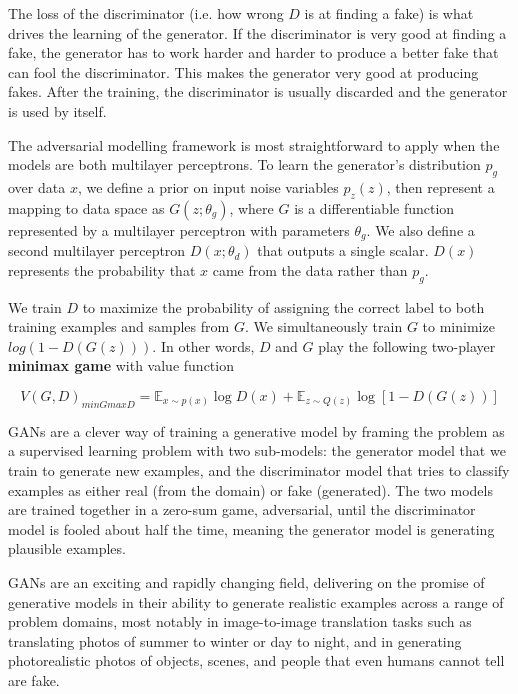 \documentclass[a4paper]{article}
\begin{document}
    The loss of the discriminator (i.e. how wrong $D$ is at finding a fake) is what drives the 
    learning of the generator. If the discriminator is very good at finding a fake, the generator 
    has to work harder and harder to produce a better fake that can fool the discriminator. This
    makes the generator very good at producing fakes. After the training, the discriminator is usually
    discarded and the generator is used by itself.

    The adversarial modelling framework is most straightforward to apply when the models are both
    multilayer perceptrons. To learn the generator’s distribution $p_{g}$ over data $x$, we define a prior on
    input noise variables $p_{z}(z)$, then represent a mapping to data space as $G(z; \theta_{g})$, where $G$ is a
    differentiable function represented by a multilayer perceptron with parameters $\theta_{g}$. We also define a
    second multilayer perceptron $D(x; \theta_{d})$ that outputs a single scalar. $D(x)$ represents the probability
    that $x$ came from the data rather than $p_{g}$. 
    
    We train $D$ to maximize the probability of assigning the
    correct label to both training examples and samples from $G$. We simultaneously train $G$ to minimize
    $log(1 - D(G(z)))$. In other words, $D$ and $G$ play the following two-player 
    {\bfseries minimax game} with value function

    \[ V(G,D)_{minGmaxD} = \mathbb{E}_{x \sim p(x)} \log D(x) + \mathbb{E}_{z \sim Q(z)} \log [1 - D(G(z))] \]

    GANs are a clever way of training a generative model by framing the problem as a 
    supervised learning problem with two sub-models: the generator model that we train to 
    generate new examples, and the discriminator model that tries to classify examples as 
    either real (from the domain) or fake (generated). The two models are trained together in 
    a zero-sum game, adversarial, until the discriminator model is fooled about half the time, 
    meaning the generator model is generating plausible examples.

    GANs are an exciting and rapidly changing field, delivering on the promise of generative 
    models in their ability to generate realistic examples across a range of problem domains, 
    most notably in image-to-image translation tasks such as translating photos of summer to 
    winter or day to night, and in generating photorealistic photos of objects, scenes, and 
    people that even humans cannot tell are fake.
    
\end{document}
